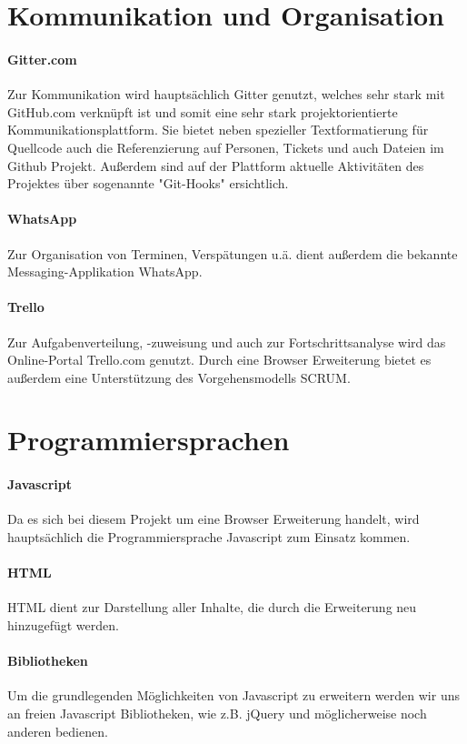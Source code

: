 \documentclass[11pt]{scrreprt}
\begin{document}
\section{Kommunikation und Organisation}
\paragraph{Gitter.com}
Zur Kommunikation wird haupts\"achlich Gitter genutzt, welches sehr stark mit GitHub.com verkn\"upft ist und somit eine sehr stark projektorientierte Kommunikationsplattform. Sie bietet neben spezieller Textformatierung f\"ur Quellcode auch die Referenzierung auf Personen, Tickets und auch Dateien im Github Projekt. Außerdem sind auf der Plattform aktuelle Aktivit\"aten des Projektes \"uber sogenannte "Git-Hooks" ersichtlich.
\paragraph{WhatsApp}
Zur Organisation von Terminen, Versp\"atungen u.ä. dient außerdem die bekannte Messaging-Applikation WhatsApp.
\paragraph{Trello}
Zur Aufgabenverteilung, -zuweisung und auch zur Fortschrittsanalyse wird das Online-Portal Trello.com genutzt. Durch eine Browser Erweiterung bietet es außerdem eine Unterstützung des Vorgehensmodells SCRUM.

\section{Programmiersprachen}
\paragraph{Javascript}
Da es sich bei diesem Projekt um eine Browser Erweiterung handelt, wird hauptsächlich die Programmiersprache Javascript zum Einsatz kommen.
\paragraph{HTML}
HTML dient zur Darstellung aller Inhalte, die durch die Erweiterung neu hinzugefügt werden.
\paragraph{Bibliotheken}
Um die grundlegenden Möglichkeiten von Javascript zu erweitern werden wir uns an freien Javascript Bibliotheken, wie z.B. jQuery und möglicherweise noch anderen bedienen.
\end{document}
